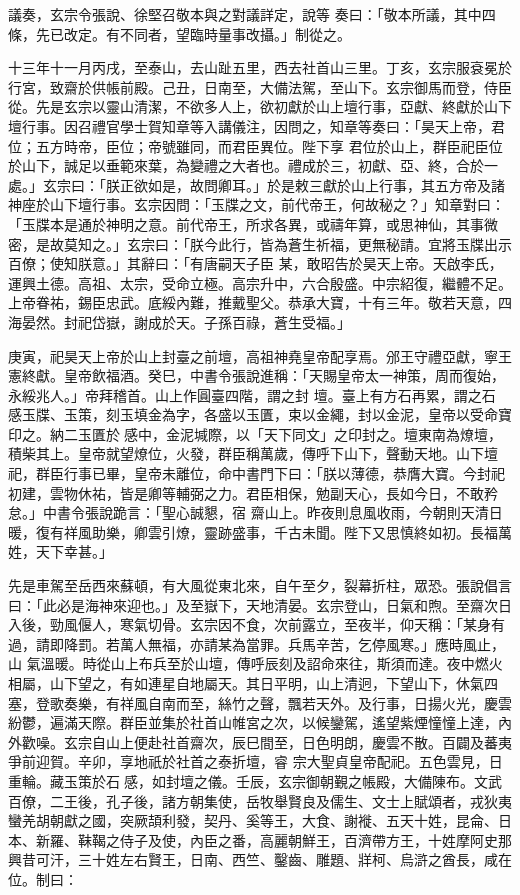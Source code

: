 \begin{pinyinscope}
 議奏，玄宗令張說、徐堅召敬本與之對議詳定，說等
 奏曰：「敬本所議，其中四條，先已改定。有不同者，望臨時量事改攝。」制從之。



 十三年十一月丙戌，至泰山，去山趾五里，西去社首山三里。丁亥，玄宗服袞冕於行宮，致齋於供帳前殿。己丑，日南至，大備法駕，至山下。玄宗御馬而登，侍臣從。先是玄宗以靈山清潔，不欲多人上，欲初獻於山上壇行事，亞獻、終獻於山下壇行事。因召禮官學士賀知章等入講儀注，因問之，知章等奏曰：「昊天上帝，君位；五方時帝，臣位；帝號雖同，而君臣異位。陛下享
 君位於山上，群臣祀臣位於山下，誠足以垂範來葉，為變禮之大者也。禮成於三，初獻、亞、終，合於一處。」玄宗曰：「朕正欲如是，故問卿耳。」於是敕三獻於山上行事，其五方帝及諸神座於山下壇行事。玄宗因問：「玉牒之文，前代帝王，何故秘之？」知章對曰：「玉牒本是通於神明之意。前代帝王，所求各異，或禱年算，或思神仙，其事微密，是故莫知之。」玄宗曰：「朕今此行，皆為蒼生祈福，更無秘請。宜將玉牒出示百僚；使知朕意。」其辭曰：「有唐嗣天子臣
 某，敢昭告於昊天上帝。天啟李氏，運興土德。高祖、太宗，受命立極。高宗升中，六合殷盛。中宗紹復，繼體不足。上帝眷祐，錫臣忠武。底綏內難，推戴聖父。恭承大寶，十有三年。敬若天意，四海晏然。封祀岱嶽，謝成於天。子孫百祿，蒼生受福。」



 庚寅，祀昊天上帝於山上封臺之前壇，高祖神堯皇帝配享焉。邠王守禮亞獻，寧王憲終獻。皇帝飲福酒。癸巳，中書令張說進稱：「天賜皇帝太一神策，周而復始，永綏兆人。」帝拜稽首。山上作圓臺四階，謂之封
 壇。臺上有方石再累，謂之石感玉牒、玉策，刻玉填金為字，各盛以玉匱，束以金繩，封以金泥，皇帝以受命寶印之。納二玉匱於感中，金泥堿際，以「天下同文」之印封之。壇東南為燎壇，積柴其上。皇帝就望燎位，火發，群臣稱萬歲，傳呼下山下，聲動天地。山下壇祀，群臣行事已畢，皇帝未離位，命中書門下曰：「朕以薄德，恭膺大寶。今封祀初建，雲物休祐，皆是卿等輔弼之力。君臣相保，勉副天心，長如今日，不敢矜怠。」中書令張說跪言：「聖心誠懇，宿
 齋山上。昨夜則息風收雨，今朝則天清日暖，復有祥風助樂，卿雲引燎，靈跡盛事，千古未聞。陛下又思慎終如初。長福萬姓，天下幸甚。」



 先是車駕至岳西來蘇頓，有大風從東北來，自午至夕，裂幕折柱，眾恐。張說倡言曰：「此必是海神來迎也。」及至嶽下，天地清晏。玄宗登山，日氣和煦。至齋次日入後，勁風偃人，寒氣切骨。玄宗因不食，次前露立，至夜半，仰天稱：「某身有過，請即降罰。若萬人無福，亦請某為當罪。兵馬辛苦，乞停風寒。」應時風止，山
 氣溫暖。時從山上布兵至於山壇，傳呼辰刻及詔命來往，斯須而達。夜中燃火相屬，山下望之，有如連星自地屬天。其日平明，山上清迥，下望山下，休氣四塞，登歌奏樂，有祥風自南而至，絲竹之聲，飄若天外。及行事，日揚火光，慶雲紛鬱，遍滿天際。群臣並集於社首山帷宮之次，以候鑾駕，遙望紫煙憧憧上達，內外歡噪。玄宗自山上便赴社首齋次，辰巳間至，日色明朗，慶雲不散。百闢及蕃夷爭前迎賀。辛卯，享地祇於社首之泰折壇，睿
 宗大聖貞皇帝配祀。五色雲見，日重輪。藏玉策於石感，如封壇之儀。壬辰，玄宗御朝覲之帳殿，大備陳布。文武百僚，二王後，孔子後，諸方朝集使，岳牧舉賢良及儒生、文士上賦頌者，戎狄夷蠻羌胡朝獻之國，突厥頡利發，契丹、奚等王，大食、謝褷、五天十姓，昆侖、日本、新羅、靺鞨之侍子及使，內臣之番，高麗朝鮮王，百濟帶方王，十姓摩阿史那興昔可汗，三十姓左右賢王，日南、西竺、鑿齒、雕題、牂柯、烏滸之酋長，咸在位。制曰：




\end{pinyinscope}
